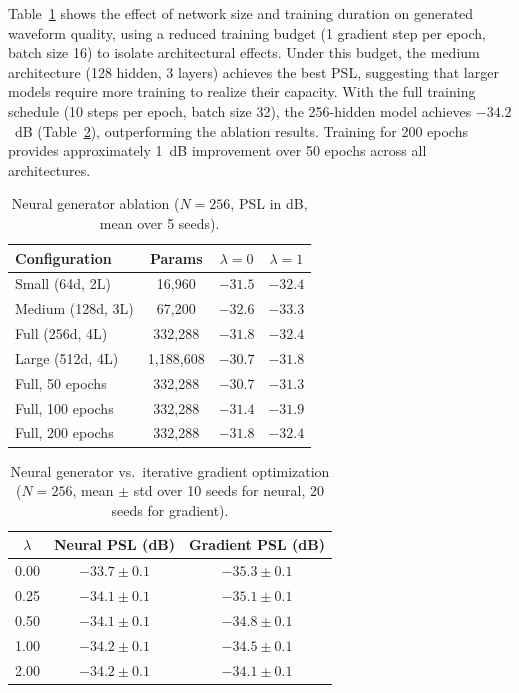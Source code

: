\documentclass[journal]{IEEEtran}
\begin{document}
Table~\ref{tab:ablation} shows the effect of network size and training duration on generated waveform quality, using a reduced training budget (1 gradient step per epoch, batch size 16) to isolate architectural effects.
Under this budget, the medium architecture (128 hidden, 3 layers) achieves the best PSL, suggesting that larger models require more training to realize their capacity.
With the full training schedule (10 steps per epoch, batch size 32), the 256-hidden model achieves $-34.2$~dB (Table~\ref{tab:neural_results}), outperforming the ablation results.
Training for 200 epochs provides approximately 1~dB improvement over 50 epochs across all architectures.

\begin{table}[!htbp]
\centering
\caption{Neural generator ablation ($N=256$, PSL in dB, mean over 5 seeds).}
\label{tab:ablation}
\renewcommand{\arraystretch}{1.1}
\begin{tabular}{@{}lccc@{}}
\toprule
\textbf{Configuration} & \textbf{Params} & $\lambda{=}0$ & $\lambda{=}1$ \\
\midrule
Small (64d, 2L)  & 16{,}960   & $-31.5$ & $-32.4$ \\
Medium (128d, 3L) & 67{,}200   & $-32.6$ & $-33.3$ \\
Full (256d, 4L)   & 332{,}288  & $-31.8$ & $-32.4$ \\
Large (512d, 4L)  & 1{,}188{,}608 & $-30.7$ & $-31.8$ \\
\midrule
Full, 50 epochs          & 332{,}288  & $-30.7$ & $-31.3$ \\
Full, 100 epochs         & 332{,}288  & $-31.4$ & $-31.9$ \\
Full, 200 epochs         & 332{,}288  & $-31.8$ & $-32.4$ \\
\bottomrule
\end{tabular}
\end{table}

\begin{table}[!htbp]
\centering
\caption{Neural generator vs.\ iterative gradient optimization ($N=256$, mean $\pm$ std over 10 seeds for neural, 20 seeds for gradient).}
\label{tab:neural_results}
\renewcommand{\arraystretch}{1.1}
\begin{tabular}{@{}ccc@{}}
\toprule
$\lambda$ & \textbf{Neural PSL (dB)} & \textbf{Gradient PSL (dB)} \\
\midrule
0.00 & $-33.7{\pm}0.1$ & $-35.3{\pm}0.1$ \\
0.25 & $-34.1{\pm}0.1$ & $-35.1{\pm}0.1$ \\
0.50 & $-34.1{\pm}0.1$ & $-34.8{\pm}0.1$ \\
1.00 & $-34.2{\pm}0.1$ & $-34.5{\pm}0.1$ \\
2.00 & $-34.2{\pm}0.1$ & $-34.1{\pm}0.1$ \\
\bottomrule
\end{tabular}
\end{table}
\end{document}
